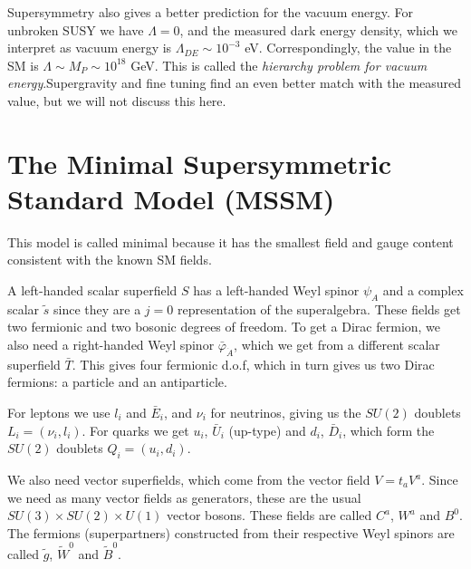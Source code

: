 \documentclass[twoside,english]{uiofysmaster}
\begin{document}
Supersymmetry also gives a better prediction for the vacuum energy. For unbroken SUSY we have $\Lambda = 0$, and the measured dark energy density, which we interpret as vacuum energy is $\Lambda_{DE} \sim 10^{-3}$ eV. Correspondingly, the value in the SM is $\Lambda \sim M_P \sim 10^{18}$ GeV. This is called the \textit{hierarchy problem for vacuum energy}.Supergravity and fine tuning find an even better match with the measured value, but we will not discuss this here.

\section{The Minimal Supersymmetric Standard Model (MSSM)} 

This model is called minimal because it has the smallest field and gauge content consistent with the known SM fields.

A left-handed scalar superfield $S$ has a left-handed Weyl spinor $\psi_A$ and a complex scalar $\tilde{s}$ since they are a $j=0$ representation of the superalgebra. These fields get two fermionic and two bosonic degrees of freedom. To get a Dirac fermion, we also need a right-handed Weyl spinor $\bar{\varphi}_{\dot{A}}$, which we get from a different scalar superfield $\bar{T}$. This gives four fermionic d.o.f, which in turn gives us two Dirac fermions: a particle and an antiparticle.

For leptons we use $l_i$ and $\bar{E}_i$, and $\nu_i$ for neutrinos, giving us the $SU(2)$ doublets $L_i = (\nu_i, l_i)$. For quarks we get $u_i$, $\bar{U}_i$ (up-type) and $d_i$, $\bar{D}_i$, which form the $SU(2)$ doublets $Q_i = (u_i, d_i)$.

We also need vector superfields, which come from the vector field $V = t_aV^a$. Since we need as many vector fields as generators, these are the usual $SU(3) \times SU(2) \times U(1)$ vector bosons. These fields are called $C^a$, $W^a$ and $B^0$. The fermions (superpartners) constructed from their respective Weyl spinors are called $\tilde{g}$, $\tilde{W}^0$ and $\tilde{B}^0$.
\end{document}
